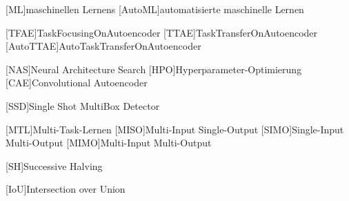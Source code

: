 \begin{acronym}[IEEE]
	[ML]{maschinellen Lernens}
	[AutoML]{automatisierte maschinelle Lernen}
	
	[TFAE]{TaskFocusingOnAutoencoder}
	[TTAE]{TaskTransferOnAutoencoder}
	[AutoTTAE]{AutoTaskTransferOnAutoencoder}
	
	[NAS]{Neural Architecture Search}
	[HPO]{Hyperparameter-Optimierung}	
	[CAE]{Convolutional Autoencoder}	
	
	[SSD]{Single Shot MultiBox Detector}
	
	[MTL]{Multi-Task-Lernen}		
	[MISO]{Multi-Input Single-Output}	
	[SIMO]{Single-Input Multi-Output}	
	[MIMO]{Multi-Input Multi-Output}	
	

	[SH]{Successive Halving}	
	
	[IoU]{Intersection over Union}	
\end{acronym}
